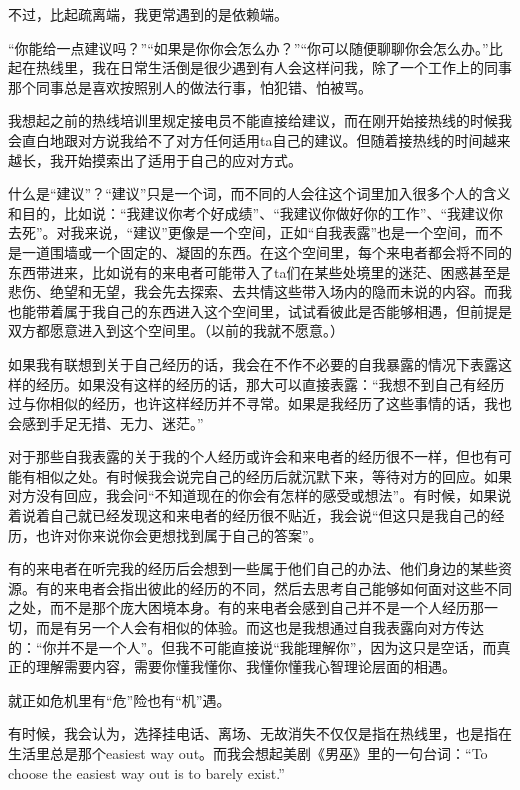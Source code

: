 不过，比起疏离端，我更常遇到的是依赖端。

“你能给一点建议吗？”“如果是你你会怎么办？”“你可以随便聊聊你会怎么办。”比起在热线里，我在日常生活倒是很少遇到有人会这样问我，除了一个工作上的同事\pozhehao{}那个同事总是喜欢按照别人的做法行事，怕犯错、怕被骂。

我想起之前的热线培训里规定接电员不能直接给建议，而在刚开始接热线的时候我会直白地跟对方说我给不了对方任何适用ta自己的建议。但随着接热线的时间越来越长，我开始摸索出了适用于自己的应对方式。

什么是“建议”？“建议”只是一个词，而不同的人会往这个词里加入很多个人的含义和目的，比如说：“我建议你考个好成绩”、“我建议你做好你的工作”、“我建议你去死”。对我来说，“建议”更像是一个空间，正如“自我表露”也是一个空间，而不是一道围墙或一个固定的、凝固的东西。在这个空间里，每个来电者都会将不同的东西带进来，比如说有的来电者可能带入了ta们在某些处境里的迷茫、困惑甚至是悲伤、绝望和无望，我会先去探索、去共情这些带入场内的隐而未说的内容。而我也能带着属于我自己的东西进入这个空间里，试试看彼此是否能够相遇，但前提是双方都愿意进入到这个空间里。（以前的我就不愿意。）

如果我有联想到关于自己经历的话，我会在不作不必要的自我暴露的情况下表露这样的经历。如果没有这样的经历的话，那大可以直接表露：“我想不到自己有经历过与你相似的经历，也许这样经历并不寻常。如果是我经历了这些事情的话，我也会感到手足无措、无力、迷茫。”

对于那些自我表露的关于我的个人经历或许会和来电者的经历很不一样，但也有可能有相似之处。有时候我会说完自己的经历后就沉默下来，等待对方的回应。如果对方没有回应，我会问“不知道现在的你会有怎样的感受或想法”。有时候，如果说着说着自己就已经发现这和来电者的经历很不贴近，我会说“但这只是我自己的经历，也许对你来说你会更想找到属于自己的答案”。

有的来电者在听完我的经历后会想到一些属于他们自己的办法、他们身边的某些资源。有的来电者会指出彼此的经历的不同，然后去思考自己能够如何面对这些不同之处，而不是那个庞大困境本身。有的来电者会感到自己并不是一个人经历那一切，而是有另一个人会有相似的体验。而这也是我想通过自我表露向对方传达的：“你并不是一个人”。但我不可能直接说“我能理解你”，因为这只是空话，而真正的理解需要内容，需要你懂我懂你、我懂你懂我\pozhehao{}心智理论层面的相遇。

就正如危机里有“危”险也有“机”遇。

有时候，我会认为，选择挂电话、离场、无故消失\pozhehao{}不仅仅是指在热线里，也是指在生活里\pozhehao{}总是那个easiest way out。而我会想起美剧《男巫》里的一句台词：“To choose the easiest way out is to barely exist.”


